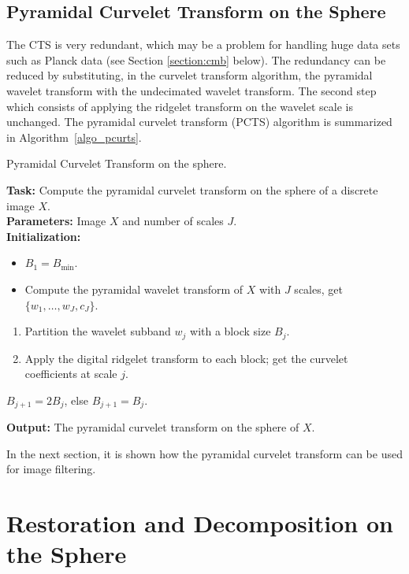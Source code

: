 \subsection{Pyramidal Curvelet Transform on the Sphere}
The CTS is very redundant, which may be a problem for handling huge data sets such as 
Planck data (see Section \ref{section:cmb} below). 
The redundancy can be reduced by substituting, in the 
curvelet transform algorithm, the pyramidal wavelet transform with the undecimated wavelet transform.
The second step which consists of applying the ridgelet transform on the wavelet scale is unchanged.
The pyramidal curvelet transform (PCTS) algorithm is summarized in Algorithm~\ref{algo_pcurts}.

{\linespread{1}
\begin{algorithm}[h]
\caption{Pyramidal Curvelet Transform on the sphere.}
\label{algo_pcurts}
{\bf Task:} Compute the pyramidal curvelet transform on the sphere of a discrete image $X$.\\
{\bf Parameters:} Image $X$ and number of scales $J$.\\
{\bf Initialization:} 
\begin{itemize}
\item $B_1 = B_{\min}$.
\item Compute the pyramidal wavelet transform of $X$ with $J$ scales, get $\{w_1,\dots,w_J,c_J\}$.
\end{itemize}
 {
\begin{enumerate}[1.]
\item Partition the wavelet subband $w_j$ with a block size $B_j$.
\item Apply the digital ridgelet transform to each block; get the curvelet coefficients at scale $j$.
\end{enumerate}
 $B_{j+1} = 2 B_{j}$,  else $B_{j+1} = B_{j}$.
}
{\bf Output:} The pyramidal curvelet transform on the sphere of $X$.
\end{algorithm}
}

In the next section, it is shown how the pyramidal curvelet transform can be used for image filtering.




\section{Restoration and Decomposition on the Sphere}
\label{sect_exp}

